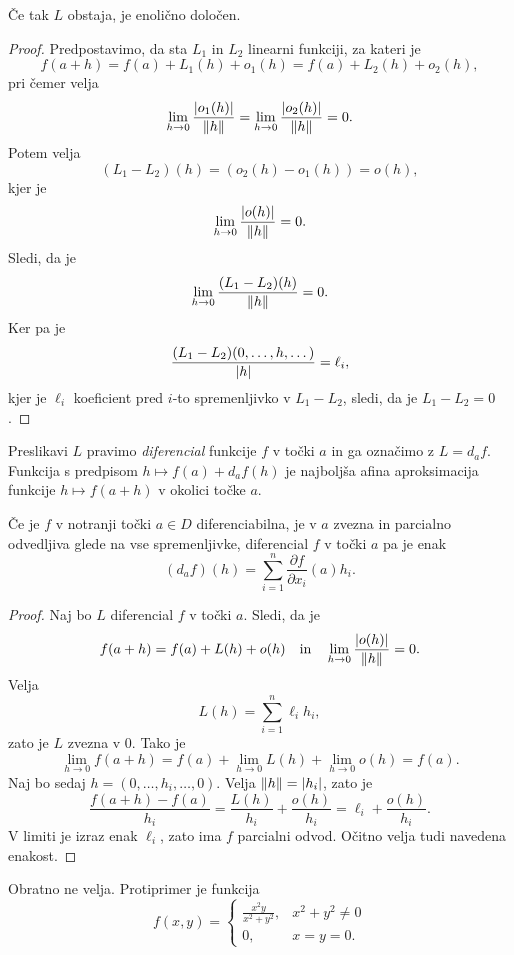\begin{trditev}
Če tak $L$ obstaja, je enolično določen.
\end{trditev}

\begin{proof}
Predpostavimo, da sta $L_1$ in $L_2$ linearni funkciji, za kateri
je
\[
f(a+h) = f(a) + L_1(h) + o_1(h) = f(a) + L_2(h) + o_2(h),
\]
pri čemer velja
\[
\lim_{h \to 0}\frac{\left\lvert o_1(h)\right\rvert}{\left\lVert h\right\rVert} =
\lim_{h \to 0}\frac{\left\lvert o_2(h)\right\rvert}{\left\lVert h\right\rVert} = 0.
\]
Potem velja
\[
(L_1 - L_2)(h) = (o_2(h) - o_1(h)) = o(h),
\]
kjer je
\[
\lim_{h \to 0}\frac{\left\lvert o(h)\right\rvert}{\left\lVert h\right\rVert} = 0.
\]
Sledi, da je
\[
\lim_{h \to 0}\frac{(L_1 - L_2)(h)}{\left\lVert h\right\rVert} = 0.
\]
Ker pa je
\[
\frac{(L_1 - L_2)(0, \dots, h, \dots)}{\left\lvert h\right\rvert} = \ell_i,
\]
kjer je $\ell_i$ koeficient pred $i$-to spremenljivko v
$L_1 - L_2$, sledi, da je $L_1 - L_2 = 0$.
\end{proof}


\begin{opomba}
Preslikavi $L$ pravimo \emph{diferencial} funkcije $f$ v točki $a$
in ga označimo z $L = d_af$. Funkcija s predpisom
$h \mapsto f(a) + d_af(h)$ je najboljša afina aproksimacija
funkcije $h \mapsto f(a+h)$ v okolici točke $a$.
\end{opomba}

\begin{izrek}
Če je $f$ v notranji točki $a \in D$ diferenciabilna, je v $a$
zvezna in parcialno odvedljiva glede na vse spremenljivke,
diferencial $f$ v točki $a$ pa je enak
\[
(d_af)(h) = \sum_{i=1}^n \frac{\partial f}{\partial x_i}(a) h_i.
\]
\end{izrek}

\begin{proof}
Naj bo $L$ diferencial $f$ v točki $a$. Sledi, da je
\[
f(a+h) = f(a) + L(h) + o(h)
\quad \text{in} \quad
\lim_{h \to 0}\frac{\left\lvert o(h)\right\rvert}{\left\lVert h\right\rVert} = 0.
\]
Velja
\[
L(h) = \sum_{i=1}^n \ell_i h_i,
\]
zato je $L$ zvezna v $0$. Tako je
\[
\lim_{h \to 0}f(a+h) =
f(a) + \lim_{h \to 0} L(h) + \lim_{h \to 0}o(h) =
f(a).
\]
Naj bo sedaj $h = (0,\dots, h_i, \dots,0)$. Velja
$\left\lVert h\right\rVert = \left\lvert h_i\right\rvert$, zato je
\[
\frac{f(a+h) - f(a)}{h_i} =
\frac{L(h)}{h_i} + \frac{o(h)}{h_i} =
\ell_i + \frac{o(h)}{h_i}.
\]
V limiti je izraz enak $\ell_i$, zato ima $f$ parcialni odvod.
Očitno velja tudi navedena enakost.
\end{proof}

\begin{opomba}
Obratno ne velja. Protiprimer je funkcija
\[
f(x,y)=\begin{cases}
\frac{x^2y}{x^2+y^2},& x^2+y^2\ne 0 \\
0,& x=y=0.
\end{cases}
\]
\end{opomba}

